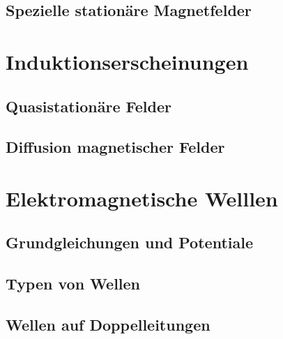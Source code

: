 	\subsection{Spezielle stationäre Magnetfelder}
	
	\section{Induktionserscheinungen}
	\subsection{Quasistationäre Felder}
	
	\subsection{Diffusion magnetischer Felder}
	
	\section{Elektromagnetische Welllen}
	\subsection{Grundgleichungen und Potentiale}
	
	\subsection{Typen von Wellen}
	
	\subsection{Wellen auf Doppelleitungen}
	